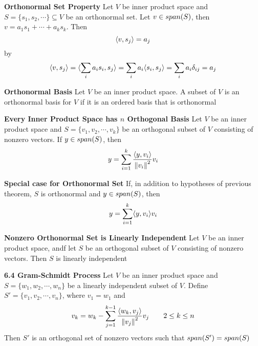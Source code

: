 \documentclass[11pt]{article}
\begin{document}
\begin{defn*}
    \textbf{Orthonormal Set Property} Let $V$ be inner product space and \\ $S = \{s_1,s_2,\cdots\}\subseteq V$ be an orthonormal set. Let $v\in span(S)$, then $v = a_1s_1 + \cdots + a_k s_k$. Then 
    \[
        \langle v,s_j\rangle = a_j    
    \]
    by
    \[
        \langle v,s_j\rangle = \langle\sum_i a_i s_i,s_j\rangle = \sum_i a_i \langle s_i,s_j\rangle = \sum_i a_i \delta_{ij} = a_j    
    \]
\end{defn*}


 

\begin{defn*}
    \textbf{Orthonormal Basis} Let $V$ be an inner product space. A subset of $V$ is an orthonormal basis for $V$ if it is an ordered basis that is orthonormal
\end{defn*}

\begin{defn*}
    \textbf{Every Inner Product Space has $n$ Orthogonal Basis} Let $V$ be an inner product space and $S = \{ v_1, v_2, \cdots, v_k\}$ be an orthogonal subset of $V$ consisting of nonzero vectors. If $y\in span(S)$, then 
    \[
        y = \sum_{i=1}^k \frac{\langle y,v_i\rangle}{\left\lVert v_i\right\rVert^2} v_i
    \]
\end{defn*}

\begin{corollary*}
    \textbf{Special case for Orthonormal Set} If, in addition to hypotheses of previous theorem, $S$ is orthonormal and $y\in span(S)$, then 
    \[
        y = \sum_{i=1}^k \langle y,v_i\rangle v_i    
    \]
\end{corollary*}

\begin{corollary*}
    \textbf{Nonzero Orthonormal Set is Linearly Independent} Let $V$ be an inner product space, andf let $S$ be an orthogonal subset of $V$ consisting of nonzero vectors. Then $S$ is linearly independent
\end{corollary*}

\begin{theorem*}
    \textbf{6.4 Gram-Schmidt Process} Let $V$ be an inner product space and $S = \{w_1,w_2,\cdots, w_n\}$ be a linearly independent subset of $V$. Define $S' = \{v_1,v_2,\cdots, v_n\}$, where $v_1 = w_1$ and 
    \[
        v_k = w_k - \sum_{j=1}^{k-1} \frac{\langle w_k,v_j\rangle}{\left\lVert v_j\right\rVert^2} v_j 
        \quad \quad 
        2\leq k\leq n
    \]
    Then $S'$ is an orthogonal set of nonzero vectors such that $span(S') = span(S)$
\end{theorem*}
\end{document}
